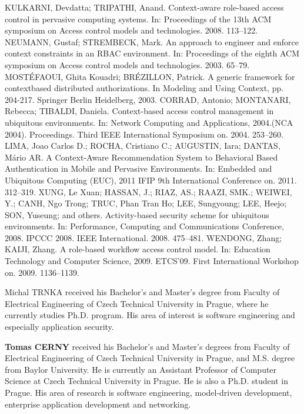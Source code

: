 \documentclass{poster15}
\begin{document}
\begin{thebibliography}{9}
KULKARNI, Devdatta; TRIPATHI, Anand. Context-aware role-based access control in pervasive computing systems. In: Proceedings of the 13th ACM symposium on Access control models and technologies. 2008. 113–122.
NEUMANN, Gustaf; STREMBECK, Mark. An approach to engineer and enforce context constraints in an RBAC environment. In: Proceedings of the eighth ACM symposium on Access control models and technologies. 2003. 65–79.
MOST\'EFAOUI, Ghita Kouadri; BR\'EZILLON, Patrick. A generic framework for contextbased distributed authorizations. In Modeling and Using Context, pp. 204-217. Springer Berlin Heidelberg, 2003.
CORRAD, Antonio; MONTANARI, Rebecca; TIBALDI, Daniela. Context-based access control management in ubiquitous environments. In: Network Computing and Applications, 2004.(NCA 2004). Proceedings. Third IEEE International Symposium on. 2004. 253–260.
LIMA, Joao Carlos D.; ROCHA, Cristiano C.; AUGUSTIN, Iara; DANTAS, Mário AR. A Context-Aware Recommendation System to Behavioral Based Authentication in Mobile and Pervasive Environments. In: Embedded and Ubiquitous Computing (EUC), 2011 IFIP 9th International Conference on. 2011. 312–319.
XUNG, Le Xuan; HASSAN, J.; RIAZ, AS.; RAAZI, SMK.; WEIWEI, Y.; CANH, Ngo Trong; TRUC, Phan
Tran Ho; LEE, Sungyoung; LEE, Heejo; SON, Yuseung; and others. Activity-based security scheme for ubiquitous environments. In: Performance, Computing and Communications Conference, 2008. IPCCC 2008. IEEE International. 2008. 475–481.
WENDONG, Zhang; KAIJI, Zhang. A role-based workflow access control model. In: Education Technology and Computer Science, 2009. ETCS’09. First International Workshop on. 2009. 1136–1139.
\end{thebibliography}

\begin{authorcv}{Michal TRNKA}
received his Bachelor's and Master's degree from Faculty of Electrical Engineering of Czech Technical University in Prague, where he currently studies Ph.D. program. His area of interest is software engineering and especially application security.

\textbf{Tomas CERNY} received his Bachelor's and Master's degrees from Faculty of Electrical Engineering of Czech Technical University in Prague, and M.S. degree from Baylor University. He is currently an Assistant Professor of Computer Science at Czech Technical University in Prague. He is also a Ph.D. student in Prague. His area of research is software engineering, model-driven development, enterprise application development and networking.
\end{authorcv}
\end{document}
